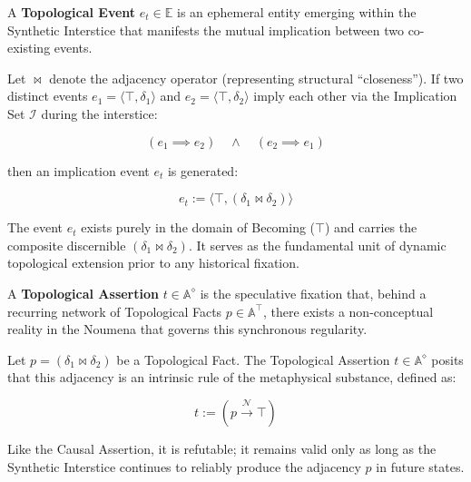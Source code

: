 \begin{formalism}

    A \textbf{Topological Event} $e_t \in \mathbb{E}$ is an ephemeral entity
    emerging within the Synthetic Interstice that manifests the mutual
    implication between two co-existing events.

    Let $\bowtie$ denote the adjacency operator (representing structural
    ``closeness''). If two distinct events $e_1 = \langle \top, \delta_1
    \rangle$ and $e_2 = \langle \top, \delta_2 \rangle$ imply each other via
    the Implication Set $\mathcal{I}$ during the interstice:

    \begin{equation}
        (e_1 \implies e_2) \quad \land \quad (e_2 \implies e_1)
    \end{equation}

    then an implication event $e_t$ is generated:

    \begin{equation}
        e_t := \langle \top, (\delta_1 \bowtie \delta_2) \rangle
    \end{equation}

    The event $e_t$ exists purely in the domain of Becoming ($\top$) and
    carries the composite discernible $(\delta_1 \bowtie \delta_2)$. It serves as
    the fundamental unit of dynamic topological extension prior to any historical fixation.

\end{formalism}

\begin{formalism}

    A \textbf{Topological Assertion} $t \in \mathbb{A}^\diamond$ is the speculative fixation
    that, behind a recurring network of Topological Facts $p \in \mathbb{A}^\top$, there
    exists a non-conceptual reality in the Noumena that governs this synchronous regularity.

    Let $p = (\delta_1 \bowtie \delta_2)$ be a Topological Fact. The Topological Assertion
    $t \in \mathbb{A}^\diamond$ posits that this adjacency is an intrinsic rule of the
    metaphysical substance, defined as:

    \begin{equation}
        t := (p \xrightarrow{\mathcal{N}} \top)
    \end{equation}

    Like the Causal Assertion, it is refutable; it remains valid only as long as the
    Synthetic Interstice continues to reliably produce the adjacency $p$ in future states.

\end{formalism}
